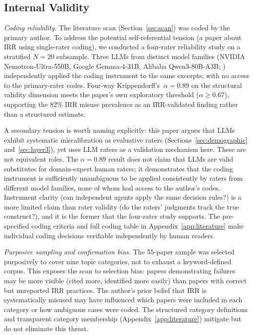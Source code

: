\documentclass[preprint,12pt]{elsarticle}
\begin{document}
\subsection{Internal Validity}
\label{sec:internal-threats}

\textit{Coding reliability.} The literature scan (Section~\ref{sec:scan}) was coded
by the primary author. To address the potential self-referential tension (a paper about
IRR using single-rater coding), we conducted a four-rater reliability study on a
stratified $N=20$ subsample. Three LLMs from distinct model families (NVIDIA
Nemotron-Ultra-550B, Google Gemma-4-31B, Alibaba Qwen3-80B-A3B;
\citealt{openrouter2026}) independently applied the coding instrument to the same
excerpts, with no access to the primary-rater codes.
Four-way Krippendorff's~$\alpha = 0.89$ on the structural validity dimension meets the
paper's own exploratory threshold ($\alpha \geq 0.67$), supporting the 82\% IRR misuse
prevalence as an IRR-validated finding rather than a structured estimate.

A secondary tension is worth naming explicitly: this paper argues that LLMs exhibit
systematic miscalibration as evaluative raters (Sections~\ref{sec:demographic}
and~\ref{sec:layer3}), yet uses LLM raters as a validation mechanism here. These are
not equivalent roles. The $\alpha = 0.89$ result does not claim that LLMs are
valid substitutes for domain-expert human raters; it demonstrates that the coding
instrument is sufficiently unambiguous to be applied consistently by raters from
different model families, none of whom had access to the author's codes. Instrument
clarity (can independent agents apply the same decision rules?) is a more limited
claim than rater validity (do the raters' judgments track the true construct?), and
it is the former that the four-rater study supports. The
pre-specified coding criteria and full coding table in Appendix~\ref{app:literature}
make individual coding decisions verifiable independently by human readers.

\textit{Purposive sampling and confirmation bias.} The 55-paper sample was selected
purposively to cover nine topic categories, not to exhaust a keyword-defined corpus.
This exposes the scan to selection bias: papers demonstrating failures may be more
visible (cited more, identified more easily) than papers with correct but unreported
IRR practices. The author's prior belief that IRR is systematically misused may have
influenced which papers were included in each category or how ambiguous cases were
coded. The structured category definitions and transparent category membership
(Appendix~\ref{app:literature}) mitigate but do not eliminate this threat.
\end{document}
